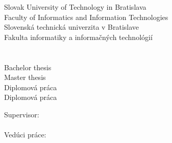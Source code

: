 
\begin{center}
\thispagestyle{empty}
{
	{\Large Slovak University of Technology in Bratislava}\textbf{}\\
	{\Large Faculty of Informatics and Information Technologies}\textbf{}\\[\baselineskip]
}
{
	{\Large Slovenská technická univerzita v Bratislave}\textbf{}\\
	{\Large Fakulta informatiky a informačných technológií}\textbf{}\\[\baselineskip]
}
\vspace*{5cm}
{\Large \Author}\textbf{}\\[\baselineskip]
{\huge \Title}\textbf{}\\[\baselineskip]
{
	{
		{\large Bachelor thesis}\\
	}
	{
		{\large Master thesis}\\
	}
}
{
	{
		{\large Diplomová práca}\\
	}
	{
		{\large Diplomová práca}\\
	}
}

\end{center}
\vspace*{6.5cm}
{
	Supervisor: \Supervisor \\\\
}
{
	Vedúci práce: \Supervisor \\\\
}
\Month\ \Year

\newpage
\null


